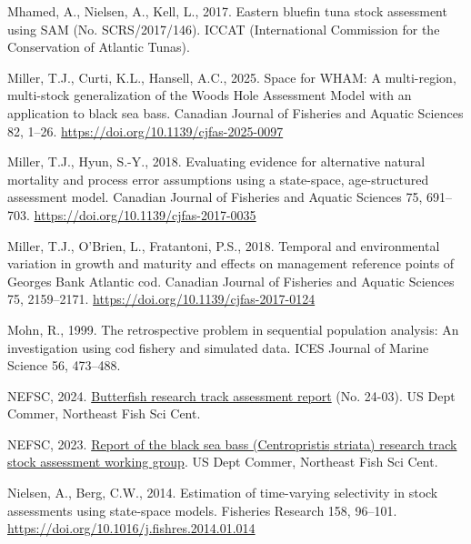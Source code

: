 \documentclass[
]{scrartcl}
\newlength{\cslhangindent}
\newenvironment{CSLReferences}[2] %
 {\begin{list}{}{%
  \setlength{\itemindent}{0pt}
  \setlength{\leftmargin}{0pt}
  \setlength{\parsep}{0pt}
  \ifodd #1
   \setlength{\leftmargin}{\cslhangindent}
   \setlength{\itemindent}{-1\cslhangindent}
  \fi
  \setlength{\itemsep}{#2\baselineskip}}}
 {\end{list}}
\begin{document}
\begin{CSLReferences}{1}{0}
Mhamed, A., Nielsen, A., Kell, L., 2017. Eastern bluefin tuna stock
assessment using {SAM} (No. SCRS/2017/146). ICCAT (International
Commission for the Conservation of Atlantic Tunas).

Miller, T.J., Curti, K.L., Hansell, A.C., 2025. Space for {WHAM}: A
multi-region, multi-stock generalization of the {Woods Hole Assessment
Model} with an application to black sea bass. Canadian Journal of
Fisheries and Aquatic Sciences 82, 1--26.
\url{https://doi.org/10.1139/cjfas-2025-0097}

Miller, T.J., Hyun, S.-Y., 2018. Evaluating evidence for alternative
natural mortality and process error assumptions using a state-space,
age-structured assessment model. Canadian Journal of Fisheries and
Aquatic Sciences 75, 691--703.
\url{https://doi.org/10.1139/cjfas-2017-0035}

Miller, T.J., O'Brien, L., Fratantoni, P.S., 2018. Temporal and
environmental variation in growth and maturity and effects on management
reference points of {Georges Bank Atlantic} cod. Canadian Journal of
Fisheries and Aquatic Sciences 75, 2159--2171.
\url{https://doi.org/10.1139/cjfas-2017-0124}

Mohn, R., 1999. The retrospective problem in sequential population
analysis: An investigation using cod fishery and simulated data. ICES
Journal of Marine Science 56, 473--488.

NEFSC, 2024.
\href{https://www.mafmc.org/s/a_2023_BSB_UNIT_RTWG_Report_V2_12_2_2023-\%20762\%201.pdf}{Butterfish
research track assessment report} (No. 24-03). US Dept Commer, Northeast
Fish Sci Cent.

NEFSC, 2023.
\href{https://www.mafmc.org/s/a_2023_BSB_UNIT_RTWG_Report_V2_12_2_2023-\%20762\%201.pdf}{Report
of the black sea bass ({Centropristis} striata) research track stock
assessment working group}. US Dept Commer, Northeast Fish Sci Cent.

Nielsen, A., Berg, C.W., 2014. Estimation of time-varying selectivity in
stock assessments using state-space models. Fisheries Research 158,
96--101. \url{https://doi.org/10.1016/j.fishres.2014.01.014}


\end{CSLReferences}
\end{document}
